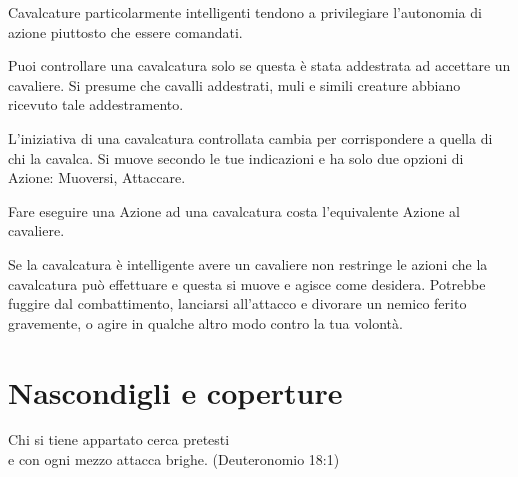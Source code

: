 \documentclass[12pt,a4paper,twoside,openany]{book}
\begin{document}
\begin{multicols}{2}
Cavalcature particolarmente intelligenti tendono a privilegiare l'autonomia di azione piuttosto che essere comandati.

Puoi controllare una cavalcatura solo se questa è stata addestrata ad accettare un cavaliere. Si presume che cavalli addestrati, muli e simili creature abbiano ricevuto tale addestramento.

L'iniziativa di una cavalcatura controllata cambia per corrispondere a quella di chi la cavalca. Si muove secondo le tue indicazioni e ha solo due opzioni di Azione: Muoversi, Attaccare.

Fare eseguire una Azione ad una cavalcatura costa l'equivalente Azione al cavaliere.

Se la cavalcatura è intelligente avere un cavaliere non restringe le azioni che la cavalcatura può effettuare e questa si muove e agisce come desidera. Potrebbe fuggire dal combattimento, lanciarsi all'attacco e divorare un nemico ferito gravemente, o agire in qualche altro modo contro la tua volontà.

\end{multicols}

\pagebreak

\pagebreak

\section{Nascondigli e coperture} \hypertarget{coperture}{}

\begin{changemargin}{0.3cm}{0.3cm}\begin{enfasi}{
Chi si tiene appartato cerca pretesti\\
e con ogni mezzo attacca brighe. (Deuteronomio 18:1)
}\end{enfasi}\end{changemargin}\medskip
\end{document}
